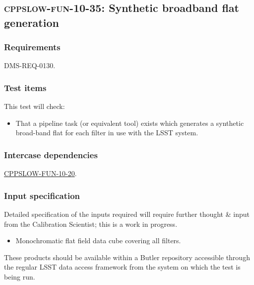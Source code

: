 \subsection{\textsc{cppslow-fun-10-35}: Synthetic broadband flat generation}
\label{cppslow-fun-10-35}

\subsubsection{Requirements}

DMS-REQ-0130.

\subsubsection{Test items}

This test will check:

\begin{itemize}

  \item{That a pipeline task (or equivalent tool) exists which generates a
  synthetic broad-band flat for each filter in use with the LSST system.}

\end{itemize}

\subsubsection{Intercase dependencies}

\hyperref[cppslow-fun-10-20]{CPPSLOW-FUN-10-20}.

\subsubsection{Input specification}

\begin{note}
Detailed specification of the inputs required will require further thought \&
input from the Calibration Scientist; this is a work in progress.
\end{note}

\begin{itemize}

  \item{Monochromatic flat field data cube covering all filters.}

\end{itemize}

These products should be available within a Butler repository accessible
through the regular LSST data access framework from the system on which the test
is being run.

